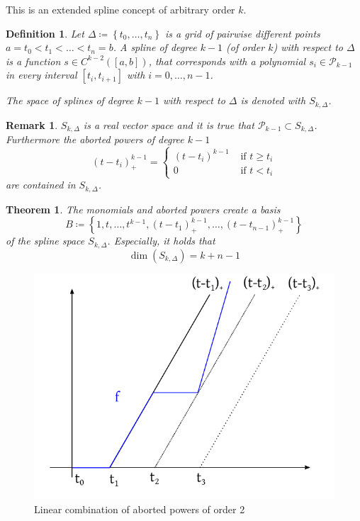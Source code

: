 \documentclass[a4paper]{article}
\newcounter{lecref}[section]
\numberwithin{lecref}{section}
\theoremstyle{break}
\newtheorem*{Thm}{Theorem}
\newtheorem{definition}[lecref]{Definition}
\newtheorem*{Remark}{Remark}
\newcommand{\Set}[1]{\left\{#1\right\}}
\begin{document}
This is an extended spline concept of arbitrary order $k$.

\begin{definition}
  \label{definition:4-19}
  Let $\Delta \coloneqq \Set{t_0, \dots, t_n}$ is a grid of pairwise different points $a = t_0 < t_1 < \dots < t_n = b$.
  A spline of degree $k-1$ (of order $k$) with respect to $\Delta$ is a function $s \in C^{k-2}([a,b])$, that corresponds with a polynomial $s_i \in \mathcal P_{k-1}$ in every interval $[t_i, t_{i+1}]$ with $i = 0, \dots, n-1$.

  The space of splines of degree $k-1$ with respect to $\Delta$ is denoted with $S_{k, \Delta}$.
\end{definition}

\begin{Remark}
  $S_{k,\Delta}$ is a real vector space and it is true that $\mathcal P_{k-1} \subset S_{k,\Delta}$.
  Furthermore the aborted powers of degree $k-1$
  \[
    (t - t_i)_+^{k-1} = \begin{cases}
      (t - t_i)^{k-1} & \text{ if } t \geq t_i \\
      0 & \text{ if } t < t_i
    \end{cases}
  \]
  are contained in $S_{k,\Delta}$.
\end{Remark}

\begin{Thm}
  \label{theorem:4-20}
  The monomials and aborted powers create a basis
  \[ B \coloneqq \Set{1, t, \dots, t^{k-1}, (t - t_1)_+^{k-1}, \dots, (t - t_{n-1})_+^{k-1}} \]
  of the spline space $S_{k,\Delta}$. Especially, it holds that
  \[ \dim(S_{k,\Delta}) = k + n - 1 \]
\end{Thm}

\begin{figure}[ht]
  \begin{center}
    \includegraphics{img/splines.pdf}
    \caption{Linear combination of aborted powers of order 2}
    \label{img:splines}
  \end{center}
\end{figure}
\end{document}
